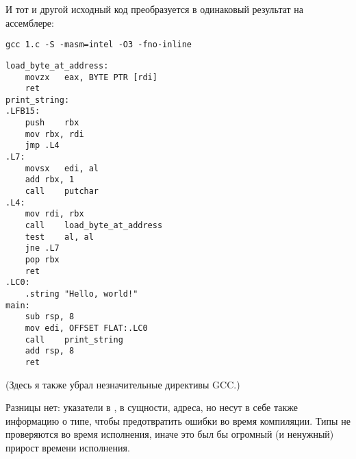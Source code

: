 И тот и другой исходный код преобразуется в одинаковый результат на ассемблере:

\begin{lstlisting}
gcc 1.c -S -masm=intel -O3 -fno-inline
\end{lstlisting}

\begin{lstlisting}[style=customasmx86]
load_byte_at_address:
	movzx	eax, BYTE PTR [rdi]
	ret
print_string:
.LFB15:
	push	rbx
	mov	rbx, rdi
	jmp	.L4
.L7:
	movsx	edi, al
	add	rbx, 1
	call	putchar
.L4:
	mov	rdi, rbx
	call	load_byte_at_address
	test	al, al
	jne	.L7
	pop	rbx
	ret
.LC0:
	.string	"Hello, world!"
main:
	sub	rsp, 8
	mov	edi, OFFSET FLAT:.LC0
	call	print_string
	add	rsp, 8
	ret
\end{lstlisting}

(Здесь я также убрал незначительные директивы GCC.)

Разницы нет: указатели в \CCpp{}, в сущности, адреса, но несут в себе также информацию о типе, чтобы предотвратить ошибки
во время компиляции.
Типы не проверяются во время исполнения, иначе это был бы огромный (и ненужный) прирост времени исполнения.

